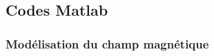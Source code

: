 \documentclass[a4paper,12pt,titlepage]{report}
\begin{document}
\begin{onehalfspace}
\begin{appendix}

\chapter{Codes Matlab}
\label{annexe_2}

\subsection{Modélisation du champ magnétique}









\iffalse

\end{appendix}
\end{onehalfspace}
\end{document}

